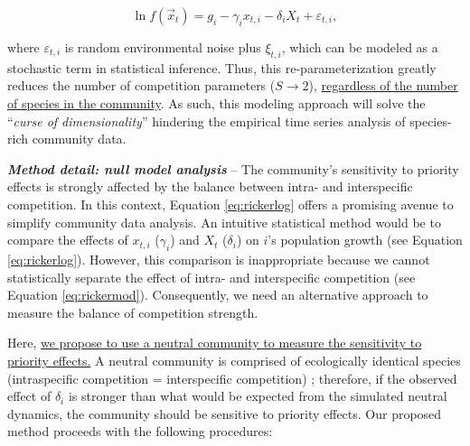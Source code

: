 \documentclass[12pt, class=article, crop=false]{standalone}
\begin{document}
\begin{equation}
\label{eq:rickerlog}
    \ln f(\overset{\rightarrow}{x}_{t}) = g_i - \gamma_i x_{t,i} - \delta_i X_t + \varepsilon_{t,i},
\end{equation}

where $\varepsilon_{t,i}$ is random environmental noise plus $\xi_{t,i}$, which can be modeled as a stochastic term in statistical inference. Thus, this re-parameterization greatly reduces the number of competition parameters ($S \rightarrow 2$), \ul{regardless of the number of species in the community}.
As such, this modeling approach will solve the ``\textit{curse of dimensionality}'' hindering the empirical time series analysis of species-rich community data.

\textbf{\textit{Method detail: null model analysis}} --
The community's sensitivity to priority effects is strongly affected by the balance between intra- and interspecific competition.
In this context, Equation \ref{eq:rickerlog} offers a promising avenue to simplify community data analysis. 
An intuitive statistical method would be to compare the effects of $x_{t,i}$ ($\gamma_i$) and $X_t$ ($\delta_i$) on $i$'s population growth (see Equation \ref{eq:rickerlog}).
However, this comparison is inappropriate because we cannot statistically separate the effect of intra- and interspecific competition (see Equation \ref{eq:rickermod}).
Consequently, we need an alternative approach to measure the balance of competition strength.

Here, \ul{we propose to use a neutral community to measure the sensitivity to priority effects.} 
A neutral community is comprised of ecologically identical species (intraspecific competition = interspecific competition) \citep{hubbell_unified_2001, loreau_species_2008}; therefore, if the observed effect of $\delta_i$ is stronger than what would be expected from the simulated neutral dynamics, the community should be sensitive to priority effects.
Our proposed method proceeds with the following procedures:
\end{document}
